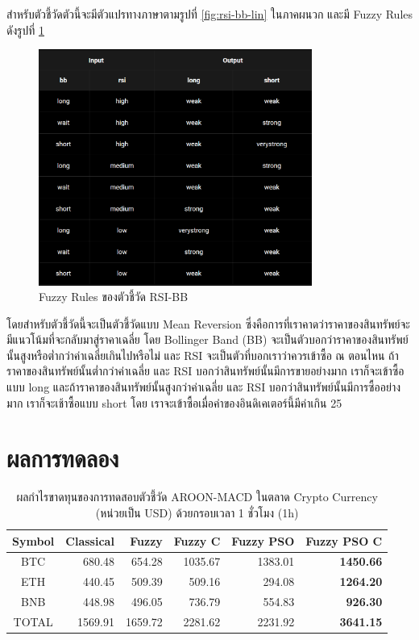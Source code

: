 สำหรับตัวชี้วัดตัวนี้จะมีตัวแปรทางภาษาตามรูปที่ \ref{fig:rsi-bb-lin} ในภาคผนวก และมี Fuzzy Rules ดังรูปที่ \ref{fig:rsi-bb-rules}
\begin{figure}[!ht]
    \centering
    \includegraphics[width=0.8\textwidth]{images/rsi-bb-rules.png}
    \caption{Fuzzy Rules ของตัวชี้วัด RSI-BB}
    \label{fig:rsi-bb-rules}
\end{figure}
โดยสำหรับตัวชี้วัดนี้จะเป็นตัวชี้วัดแบบ Mean Reversion ซึ่งคือการที่เราคาดว่าราคาของสินทรัพย์จะมีแนวโน้มที่จะกลับมาสู่ราคาเฉลี่ย โดย Bollinger Band (BB) จะเป็นตัวบอกว่าราคาของสินทรัพย์นั้นสูงหรือต่ำกว่าค่าเฉลี่ยเกินไปหรือไม่ และ RSI จะเป็นตัวที่บอกเราว่าควรเข้าซื้อ ณ ตอนไหน ถ้าราคาของสินทรัพย์นั้นต่ำกว่าค่าเฉลี่ย และ RSI บอกว่าสินทรัพย์นั้นมีการขายอย่างมาก เราก็จะเข้าซื้อแบบ long และถ้าราคาของสินทรัพย์นั้นสูงกว่าค่าเฉลี่ย และ RSI บอกว่าสินทรัพย์นั้นมีการซื้ออย่างมาก เราก็จะเช้าซื้อแบบ short โดย เราจะเข้าซื้อเมื่อค่าของอินดิเคเตอร์นี้มีค่าเกิน 25

\section{ผลการทดลอง}
\begin{table}[!htb]
    \centering
    \begin{tabular}{crrrrr}
        \hline
        \textbf{Symbol} & \textbf{Classical} & \textbf{Fuzzy} & \textbf{Fuzzy C} & \textbf{Fuzzy PSO} & \textbf{Fuzzy PSO C} \\ \hline
        BTC             & 680.48             & 654.28         & 1035.67          & 1383.01            & \textbf{1450.66}     \\ \hline
        ETH             & 440.45             & 509.39         & 509.16           & 294.08             & \textbf{1264.20}     \\ \hline
        BNB             & 448.98             & 496.05         & 736.79           & 554.83             & \textbf{926.30}      \\ \hline
        TOTAL           & 1569.91            & 1659.72        & 2281.62          & 2231.92            & \textbf{3641.15}     \\ \hline
    \end{tabular}
    \caption{ผลกำไรขาดทุนของการทดสอบตัวชี้วัด AROON-MACD ในตลาด Crypto Currency (หน่วยเป็น USD) ด้วยกรอบเวลา 1 ชั่วโมง (1h)}
    \label{tab:aroon-macd-crypto}
\end{table}

